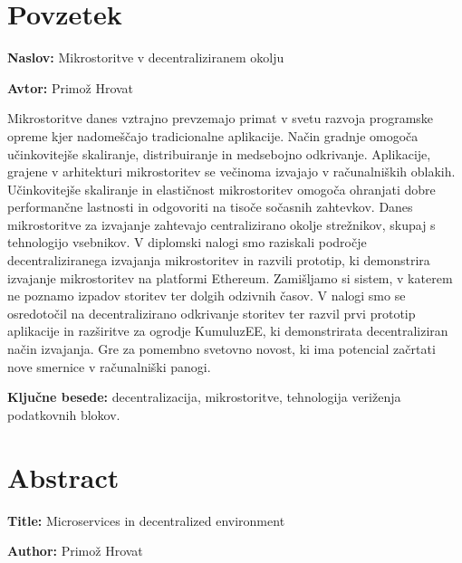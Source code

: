 \documentclass[a4paper, 12pt]{book}
\newcommand{\ttitle}{Mikrostoritve v decentraliziranem okolju}
\newcommand{\ttitleEn}{Microservices in decentralized environment}
\newcommand{\tauthor}{Primož Hrovat}
\newcommand{\tkeywords}{decentralizacija, mikrostoritve, tehnologija veriženja podatkovnih blokov}
\newcommand{\clearemptydoublepage}{\newpage{\pagestyle{empty}\cleardoublepage}}
\begin{document}
\clearemptydoublepage

\chapter*{Povzetek}

\noindent\textbf{Naslov:} \ttitle
\bigskip

\noindent\textbf{Avtor:} \tauthor
\bigskip

\noindent

Mikrostoritve danes vztrajno prevzemajo primat v svetu razvoja programske opreme kjer nadomeščajo tradicionalne aplikacije. Način gradnje omogoča učinkovitejše skaliranje, distribuiranje in medsebojno odkrivanje.
Aplikacije, grajene v arhitekturi mikrostoritev se večinoma izvajajo v ra\-ču\-nal\-ni\-ških oblakih.
Učinkovitejše skaliranje in elastičnost mikrostoritev omogoča ohranjati dobre performančne lastnosti in odgovoriti na tisoče so\-časnih zahtevkov.
Danes mikrostoritve za izvajanje zahtevajo centralizirano okolje strežnikov, skupaj s tehnologijo vsebnikov.
V diplomski nalogi smo raziskali področje decentraliziranega izvajanja mikrostoritev in razvili prototip, ki demonstrira izvajanje mikrostoritev na platformi Ethereum.
Zamišljamo si sistem, v katerem ne poznamo izpadov storitev ter dolgih odzivnih časov.
V nalogi smo se osredotočil na decentralizirano odkrivanje storitev ter razvil prvi prototip aplikacije in razširitve za ogrodje KumuluzEE, ki demonstrirata decentraliziran način izvajanja.
Gre za pomembno svetovno novost, ki ima potencial začrtati nove smernice v računalniški panogi.

\bigskip

\noindent\textbf{Ključne besede:} \tkeywords.
\clearemptydoublepage

\chapter*{Abstract}

\noindent\textbf{Title:} \ttitleEn
\bigskip

\noindent\textbf{Author:} \tauthor
\bigskip

\noindent 
\end{document}
